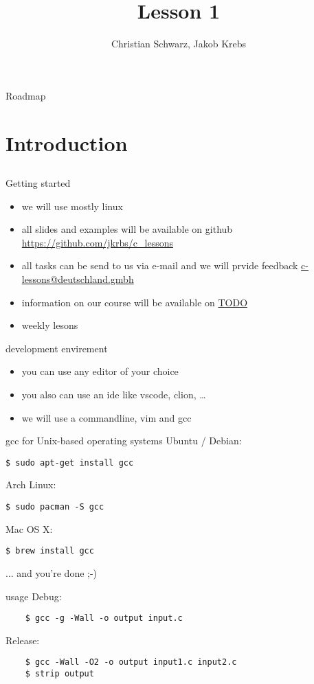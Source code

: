 \documentclass[10pt,graphics,aspectratio=169,table]{beamer}
\title{Lesson 1}
\author{Christian Schwarz, Jakob Krebs}
\begin{document}
\maketitle
\begin{frame}{Roadmap}
  \tableofcontents
\end{frame}
\section{Introduction}
\subsection{}
\begin{frame}{Getting started}
  \begin{itemize}
  \item we will use mostly linux
  \item all slides and examples will be available on github
    \url{https://github.com/jkrbs/c_lessons}
  \item all tasks can be send to us via e-mail and we will prvide feedback
    \url{c-lessons@deutschland.gmbh}
  \item information on our course will be available on \url{TODO}
  \item weekly lesons %
  \end{itemize}
\end{frame}

\begin{frame}{development envirement}
  \begin{itemize}
  \item you can use any editor of your choice
  \item you also can use an ide like vscode, clion, \ldots
  \item we will use a commandline, vim and gcc
  \end{itemize}
  
\end{frame}
\begin{frame}[fragile]{gcc for Unix-based operating systems}
	Ubuntu / Debian:
	\begin{lstlisting}[numbers=none]
    $ sudo apt-get install gcc
  \end{lstlisting}
	\bigskip
	Arch Linux:
	\begin{lstlisting}[numbers=none]
    $ sudo pacman -S gcc
  \end{lstlisting}
	\bigskip
	Mac OS X:
	\begin{lstlisting}[numbers=none]
    $ brew install gcc
  \end{lstlisting}
	\bigskip
	... and you're done ;-)
\end{frame} 
\begin{frame}[fragile]{usage}
  Debug:
  \begin{lstlisting}
    $ gcc -g -Wall -o output input.c
  \end{lstlisting}
  \bigskip
  Release:
  \begin{lstlisting}
    $ gcc -Wall -O2 -o output input1.c input2.c
    $ strip output
  \end{lstlisting}
\end{frame}
\end{document}
